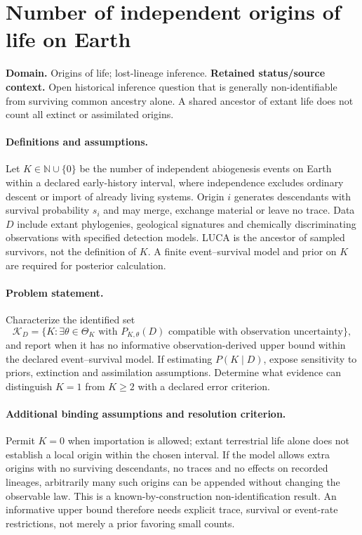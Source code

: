 \documentclass[11pt]{article}
\begin{document}
\section*{Number of independent origins of life on Earth}
\label{prob:300}
\label{rank:329}
\par\smallskip

\noindent\textbf{Domain.} Origins of life; lost-lineage inference. \quad \textbf{Retained status/source context.} Open historical inference question that is generally non-identifiable from surviving common ancestry alone. A shared ancestor of extant life does not count all extinct or assimilated origins.

\paragraph{Definitions and assumptions.} Let $K\in\mathbb{N}\cup\{0\}$ be the number of independent abiogenesis events on Earth within a declared early-history interval, where independence excludes ordinary descent or import of already living systems. Origin $i$ generates descendants with survival probability $s_i$ and may merge, exchange material or leave no trace. Data $D$ include extant phylogenies, geological signatures and chemically discriminating observations with specified detection models. LUCA is the ancestor of sampled survivors, not the definition of $K$. A finite event--survival model and prior on $K$ are required for posterior calculation.

\paragraph{Problem statement.} Characterize the identified set
\[
\mathcal K_D=\{K:\exists\theta\in\Theta_K\text{ with }P_{K,\theta}(D)
\text{ compatible with observation uncertainty}\},
\]
and report when it has no informative observation-derived upper bound within the declared event--survival model. If estimating $P(K\mid D)$, expose sensitivity to priors, extinction and assimilation assumptions. Determine what evidence can distinguish $K=1$ from $K\geq2$ with a declared error criterion.

\paragraph{Additional binding assumptions and resolution criterion.} Permit $K=0$ when importation is allowed; extant terrestrial life alone does not establish a local origin within the chosen interval. If the model allows extra origins with no surviving descendants, no traces and no effects on recorded lineages, arbitrarily many such origins can be appended without changing the observable law. This is a known-by-construction non-identification result. An informative upper bound therefore needs explicit trace, survival or event-rate restrictions, not merely a prior favoring small counts.
\end{document}
